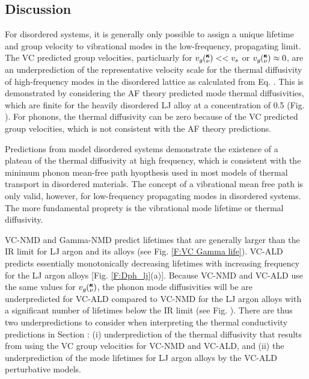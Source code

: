 \documentclass[aps,prb,onecolumn,preprint,superscriptaddress,amsmath,amssymb,floatfix]{revtex4}
\newcommand{\kv}{\mspace{-4.0mu}\left(\mspace{-8.0mu}
\begin{smallmatrix}&\pmb{\kappa} \\&\nu\end{smallmatrix}
\mspace{-3.0mu}\right)}
\begin{document}
\clearpage

\subsection{\label{S:Discussion}Discussion}

For disordered systems, it is generally only possible to assign a 
unique lifetime and group velocity to vibrational modes  
in the low-frequency, propagating limit.
\cite{feldman_numerical_1999,xu_energy_2009} 
The VC predicted group velocities, particluarly 
for $v_g\kv << v_s$ or $v_g\kv \approx 0$, 
are an underprediction of the representative 
velocity scale for the thermal diffusivity of high-frequency modes 
in the disordered lattice as calculated from Eq. . 
This is demonstrated by considering the 
AF theory predicted mode thermal diffusivities, which 
are finite for the heavily disordered LJ alloy at a concentration 
of 0.5 (Fig. ). For phonons, the thermal diffusivity can be zero 
because of the VC predicted group velocities, which is not 
consistent with the AF theory predictions. 

Predictions from model 
disordered systems demonstrate the existence of a plateau of the 
thermal diffusivity at high frequency, 
which is consistent with the minimum phonon mean-free path hyopthesis
\cite{sheng_heat_1991} used in most models of thermal 
transport in disordered materials.
\cite{kittel_interpretation_1949,cahill_lattice_1988,
graebner_phonon_1986} The concept of 
a vibrational mean free path is only valid, however, 
for low-frequency propagating 
modes in disordered systems.\cite{feldman_numerical_1999} The more 
fundamental proprety is the vibrational mode lifetime
\cite{taraskin_determination_1999} or thermal diffusivity.
\cite{allen_thermal_1993,allen_diffusons_1999,
feldman_thermal_1993,feldman_numerical_1999}

VC-NMD and Gamma-NMD predict lifetimes that 
are generally larger than the IR limit  
for LJ argon and its alloys (see Fig. \ref{F:VC Gamma life}).   
VC-ALD predicts essentially monotonically 
decreasing lifetimes with increasing frequency for the LJ argon 
alloys [Fig. \ref{F:Dph_lj}(a)]. Because VC-NMD and VC-ALD 
use the same values for $v_g\kv$, the phonon mode 
diffusivities will be are underpredicted for 
VC-ALD compared to VC-NMD for the LJ argon alloys with a 
significant number of lifetimes below the IR limit (see Fig. ). 
There are thus two underpredictions to consider 
when interpreting the thermal conductivity predictions in 
Section : (i) underprediction 
of the thermal diffusivity that results from using the VC group 
velocities for 
VC-NMD and VC-ALD, and (ii) the underprediction of the mode 
lifetimes for LJ argon alloys by the VC-ALD perturbative models. 
\end{document}
